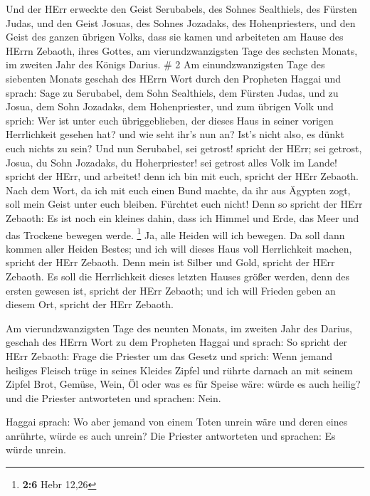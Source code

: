  Und der HErr erweckte den Geist Serubabels, des Sohnes
Sealthiels, des Fürsten Judas, und den Geist Josuas, des Sohnes
Jozadaks, des Hohenpriesters, und den Geist des ganzen übrigen Volks,
dass sie kamen und arbeiteten am Hause des HErrn Zebaoth, ihres Gottes,
 am vierundzwanzigsten Tage des sechsten Monats, im zweiten
Jahr des Königs Darius. \# 2  Am einundzwanzigsten Tage des
siebenten Monats geschah des HErrn Wort durch den Propheten Haggai und
sprach:  Sage zu Serubabel, dem Sohn Sealthiels, dem Fürsten
Judas, und zu Josua, dem Sohn Jozadaks, dem Hohenpriester, und zum
übrigen Volk und sprich:  Wer ist unter euch übriggeblieben,
der dieses Haus in seiner vorigen Herrlichkeit gesehen hat? und wie seht
ihr's nun an? Ist's nicht also, es dünkt euch nichts zu sein?
 Und nun Serubabel, sei getrost! spricht der HErr; sei
getrost, Josua, du Sohn Jozadaks, du Hoherpriester! sei getrost alles
Volk im Lande! spricht der HErr, und arbeitet! denn ich bin mit euch,
spricht der HErr Zebaoth.  Nach dem Wort, da ich mit euch
einen Bund machte, da ihr aus Ägypten zogt, soll mein Geist unter euch
bleiben. Fürchtet euch nicht!  Denn so spricht der HErr
Zebaoth: Es ist noch ein kleines dahin, dass ich Himmel und Erde, das
Meer und das Trockene bewegen werde. \footnote{\textbf{2:6} Hebr 12,26}
 Ja, alle Heiden will ich bewegen. Da soll dann kommen aller
Heiden Bestes; und ich will dieses Haus voll Herrlichkeit machen,
spricht der HErr Zebaoth.  Denn mein ist Silber und Gold,
spricht der HErr Zebaoth.  Es soll die Herrlichkeit dieses
letzten Hauses größer werden, denn des ersten gewesen ist, spricht der
HErr Zebaoth; und ich will Frieden geben an diesem Ort, spricht der HErr
Zebaoth.

 Am vierundzwanzigsten Tage des neunten Monats, im zweiten
Jahr des Darius, geschah des HErrn Wort zu dem Propheten Haggai und
sprach:  So spricht der HErr Zebaoth: Frage die Priester um
das Gesetz und sprich:  Wenn jemand heiliges Fleisch trüge
in seines Kleides Zipfel und rührte darnach an mit seinem Zipfel Brot,
Gemüse, Wein, Öl oder was es für Speise wäre: würde es auch heilig? und
die Priester antworteten und sprachen: Nein.

 Haggai sprach: Wo aber jemand von einem Toten unrein wäre
und deren eines anrührte, würde es auch unrein? Die Priester antworteten
und sprachen: Es würde unrein.

